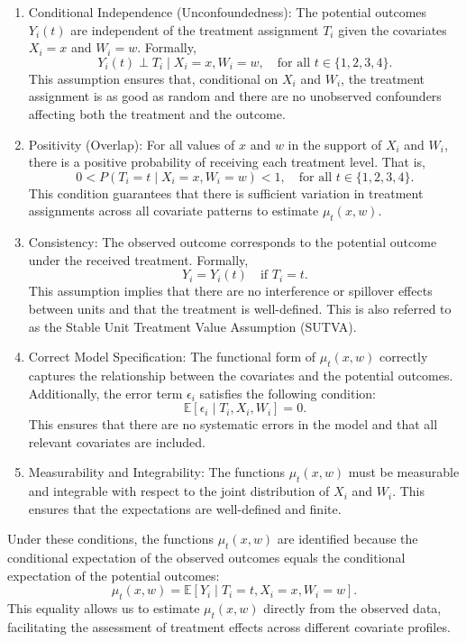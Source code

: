 \documentclass{article}
\begin{document}
\begin{enumerate}
    \item Conditional Independence (Unconfoundedness): The potential outcomes \( Y_i(t) \) are independent of the treatment assignment \( T_i \) given the covariates \( X_i = x \) and \( W_i = w \). Formally,
    \[
    Y_i(t) \perp T_i \mid X_i = x, W_i = w, \quad \text{for all } t \in \{1,2,3,4\}.
    \]
    This assumption ensures that, conditional on \( X_i \) and \( W_i \), the treatment assignment is as good as random and there are no unobserved confounders affecting both the treatment and the outcome.

    \item Positivity (Overlap): For all values of \( x \) and \( w \) in the support of \( X_i \) and \( W_i \), there is a positive probability of receiving each treatment level. That is,
    \[
    0 < P(T_i = t \mid X_i = x, W_i = w) < 1, \quad \text{for all } t \in \{1,2,3,4\}.
    \]
    This condition guarantees that there is sufficient variation in treatment assignments across all covariate patterns to estimate \( \mu_t(x, w) \).

    \item Consistency: The observed outcome corresponds to the potential outcome under the received treatment. Formally,
    \[
    Y_i = Y_i(t) \quad \text{if } T_i = t.
    \]
    This assumption implies that there are no interference or spillover effects between units and that the treatment is well-defined. This is also referred to as the Stable Unit Treatment Value Assumption (SUTVA).

    \item Correct Model Specification: The functional form of \( \mu_t(x, w) \) correctly captures the relationship between the covariates and the potential outcomes. Additionally, the error term \( \epsilon_i \) satisfies the following condition:
    \[
    \mathbb{E}[\epsilon_i \mid T_i, X_i, W_i] = 0.
    \]
    This ensures that there are no systematic errors in the model and that all relevant covariates are included.

    \item Measurability and Integrability: The functions \( \mu_t(x, w) \) must be measurable and integrable with respect to the joint distribution of \( X_i \) and \( W_i \). This ensures that the expectations are well-defined and finite.
\end{enumerate}

Under these conditions, the functions \( \mu_t(x, w) \) are identified because the conditional expectation of the observed outcomes equals the conditional expectation of the potential outcomes:
\[
\mu_t(x, w) = \mathbb{E}[Y_i \mid T_i = t, X_i = x, W_i = w].
\]
This equality allows us to estimate \( \mu_t(x, w) \) directly from the observed data, facilitating the assessment of treatment effects across different covariate profiles.
\end{document}
